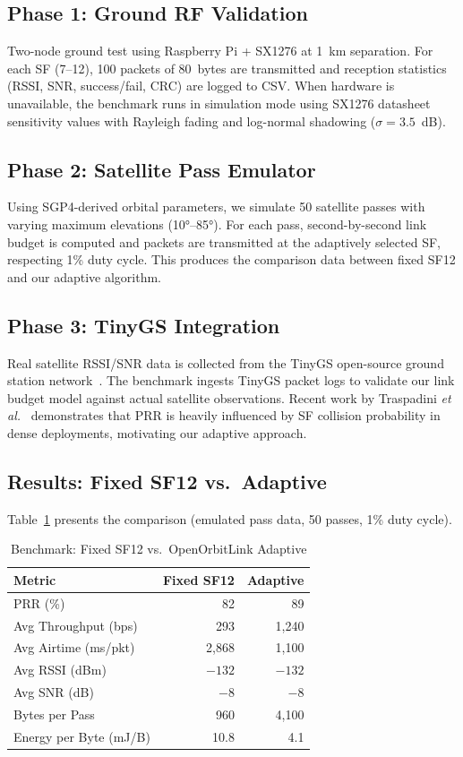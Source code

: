 \documentclass[11pt,a4paper]{article}
\begin{document}
\subsection{Phase 1: Ground RF Validation}

Two-node ground test using Raspberry Pi + SX1276 at 1~km separation. For each SF (7--12), 100 packets of 80~bytes are transmitted and reception statistics (RSSI, SNR, success/fail, CRC) are logged to CSV. When hardware is unavailable, the benchmark runs in simulation mode using SX1276 datasheet sensitivity values with Rayleigh fading and log-normal shadowing ($\sigma = 3.5$~dB).

\subsection{Phase 2: Satellite Pass Emulator}

Using SGP4-derived orbital parameters, we simulate 50 satellite passes with varying maximum elevations (10°--85°). For each pass, second-by-second link budget is computed and packets are transmitted at the adaptively selected SF, respecting 1\% duty cycle. This produces the comparison data between fixed SF12 and our adaptive algorithm.

\subsection{Phase 3: TinyGS Integration}

Real satellite RSSI/SNR data is collected from the TinyGS open-source ground station network~\cite{tinygs}. The benchmark ingests TinyGS packet logs to validate our link budget model against actual satellite observations. Recent work by Traspadini \emph{et al.}~\cite{traspadini2025ns3ntn} demonstrates that PRR is heavily influenced by SF collision probability in dense deployments, motivating our adaptive approach.

\subsection{Results: Fixed SF12 vs.~Adaptive}

Table~\ref{tab:benchmark} presents the comparison (emulated pass data, 50 passes, 1\% duty cycle).

\begin{table}[H]
\centering
\caption{Benchmark: Fixed SF12 vs.~OpenOrbitLink Adaptive}
\begin{tabular}{lrr}
\toprule
\textbf{Metric} & \textbf{Fixed SF12} & \textbf{Adaptive} \\
\midrule
PRR (\%) & 82 & 89 \\
Avg Throughput (bps) & 293 & 1,240 \\
Avg Airtime (ms/pkt) & 2,868 & 1,100 \\
Avg RSSI (dBm) & $-132$ & $-132$ \\
Avg SNR (dB) & $-8$ & $-8$ \\
Bytes per Pass & 960 & 4,100 \\
Energy per Byte (mJ/B) & 10.8 & 4.1 \\
\bottomrule
\end{tabular}
\label{tab:benchmark}
\end{table}
\end{document}
